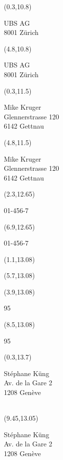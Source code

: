 \documentclass[a4paper,12pt]{letter}
\newenvironment{ocr}{\myfont}{}
\newcommand\account{01-456-7}
\newcommand\francs{168}
\newcommand\cents{95}
\newcommand\wirereceiver{UBS AG\\8001 Zürich}
\newcommand\wirefor{Mike Kruger\\Glennerstrasse 120\\6142 Gettnau}
\newcommand\wirefrom{Stéphane Küng\\Av. de la Gare 2\\1208 Genève\\}
\begin{document}
\begin{ocr}

\begin{textblock}{4.2}(0.3,10.8)
\raggedright
\wirereceiver\
\end{textblock}

\begin{textblock}{4.2}(4.8,10.8)
\raggedright
\wirereceiver\
\end{textblock}

\begin{textblock}{4.2}(0.3,11.5)
\raggedright
\wirefor\
\end{textblock}

\begin{textblock}{4.2}(4.8,11.5)
\raggedright
\wirefor\
\end{textblock}

\begin{textblock}{2.2}(2.3,12.65)
\raggedright
\account\
\end{textblock}

\begin{textblock}{2.2}(6.9,12.65)
\raggedright
\account\
\end{textblock}

\begin{textblock}{2}(1.1,13.08)
\raggedleft
\francs\
\end{textblock}

\begin{textblock}{2}(5.7,13.08)
\raggedleft
\francs\
\end{textblock}

\begin{textblock}{2}(3.9,13.08)
\raggedright
\cents\
\end{textblock}

\begin{textblock}{2}(8.5,13.08)
\raggedright
\cents\
\end{textblock}

\begin{textblock}{4}(0.3,13.7)
\raggedright
\wirefrom\
\end{textblock}

\begin{textblock}{4}(9.45,13.05)
\raggedright
\wirefrom\
\end{textblock}


\end{ocr}
\end{document}
